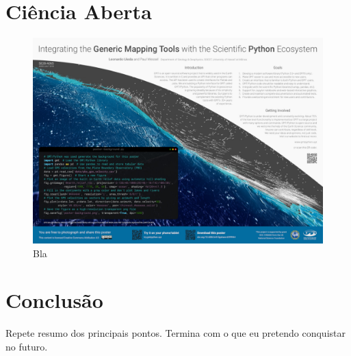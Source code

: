 \documentclass[11pt,a4paper,oneside]{book}
\begin{document}
\chapter{Ciência Aberta}


\begin{figure}[h]
  \vspace{0.5cm}
  \begin{center}
    \includegraphics[width=\textwidth]{images/aogs2018.jpg}
  \end{center}
  \caption{
    Bla
  }
\end{figure}

\chapter{Conclusão}

Repete resumo dos principais pontos.
Termina com o que eu pretendo conquistar no futuro.

\backmatter

\end{document}
